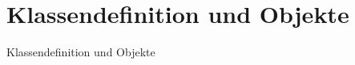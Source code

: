 \section{Klassendefinition und Objekte}\label{sec:1-objekte}
\begin{frame}{}
\begin{center}
\Huge Klassendefinition und Objekte
\end{center}
\end{frame}